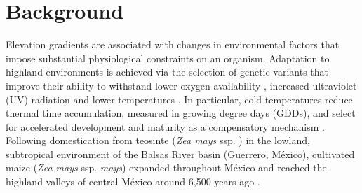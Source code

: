 \section{Background}

Elevation gradients are associated with changes in environmental factors that impose substantial physiological constraints on an organism. 
Adaptation to highland environments is achieved via the selection of genetic variants that improve their ability to withstand lower oxygen availability \citep{yi2010-se, bigham2010-is}, increased ultraviolet (UV) radiation \citep{yang2017-gs} and lower temperatures \citep{cicconardi2020-gs}.
In particular, cold temperatures reduce thermal time accumulation, measured in growing degree days (GDDs), \citep{gilmore1958-dx} and select for accelerated development and maturity as a compensatory mechanism \citep{hatfield2015-od}.
Following domestication from teosinte \parv (\textit{Zea mays} ssp. \parv) \citep{matsuoka2002-bg} in the lowland, subtropical environment of the Balsas River basin (Guerrero, M\'exico), cultivated maize (\textit{Zea mays} ssp. \textit{mays}) expanded throughout M\'exico and reached the highland valleys of central M\'exico around 6,500 years ago \citep{piperno2001-ea}.


